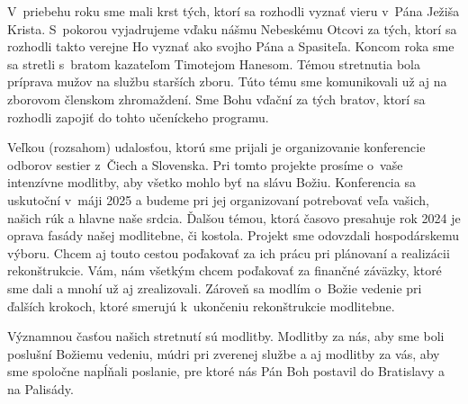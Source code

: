 V~priebehu roku sme mali krst tých, ktorí sa rozhodli vyznať vieru v~Pána Ježiša Krista. S~pokorou vyjadrujeme vďaku nášmu Nebeskému Otcovi za tých, ktorí sa rozhodli takto verejne Ho vyznať ako svojho Pána a Spasiteľa.
Koncom roka sme sa stretli s~bratom kazateľom Timotejom Hanesom. Témou stretnutia bola príprava mužov na službu starších zboru. Túto tému sme komunikovali už aj na zborovom členskom zhromaždení. Sme Bohu vďační za tých bratov, ktorí sa rozhodli zapojiť do tohto učeníckeho programu.

Veľkou (rozsahom) udalosťou, ktorú sme prijali je organizovanie konferencie odborov sestier z~Čiech a Slovenska. Pri tomto projekte prosíme o~vaše intenzívne modlitby, aby všetko mohlo byť na slávu Božiu. Konferencia sa uskutoční v~máji 2025 a budeme pri jej organizovaní potrebovať veľa vašich, našich rúk a hlavne naše srdcia.
Ďalšou témou, ktorá časovo presahuje rok 2024 je oprava fasády našej modlitebne, či kostola. Projekt sme odovzdali hospodárskemu výboru. Chcem aj touto cestou poďakovať za ich prácu pri plánovaní a realizácii rekonštrukcie. Vám, nám všetkým chcem poďakovať za finančné záväzky, ktoré sme dali a mnohí už aj zrealizovali. Zároveň sa modlím o~Božie vedenie pri ďalších krokoch, ktoré smerujú k~ukončeniu rekonštrukcie modlitebne.

Významnou časťou našich stretnutí sú modlitby. Modlitby za nás, aby sme boli poslušní Božiemu vedeniu, múdri pri zverenej službe a aj modlitby za vás, aby sme spoločne napĺňali poslanie, pre ktoré nás Pán Boh postavil do Bratislavy a na Palisády.




